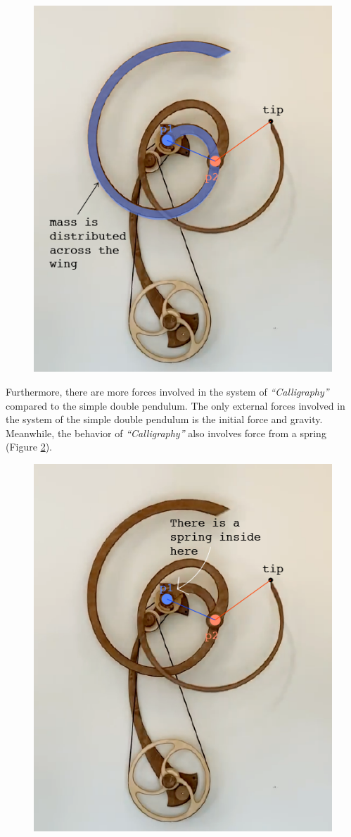 \documentclass[a4paper,12pt]{article}
\begin{document}
\begin{figure}[H]
\begin{minipage}{0.45\textwidth}
        \includegraphics[width=.9\textwidth]{dif_labelled_sculpt}
        \caption{}
        \label{fig:mass-ca}
    \end{minipage}
\end{figure}

Furthermore, there are more forces involved in the system of \textit{“Calligraphy”} compared to the simple double pendulum. The only external forces involved in the system of the simple double pendulum is the initial force and gravity. Meanwhile, the behavior of \textit{“Calligraphy”} also involves force from a spring (Figure \ref{fig:spring}). 
\begin{figure}[H]
    \centering
    \includegraphics[width=.5\textwidth]{springs}
    \caption{}
    \label{fig:spring}
\end{figure}
\end{document}

